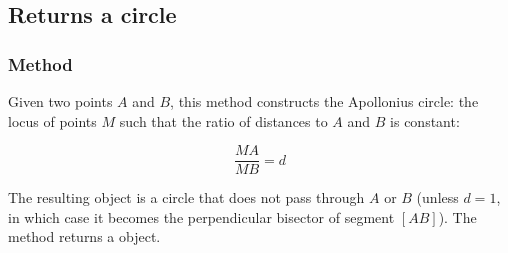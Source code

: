 \begin{minipage}{.5\textwidth}
\begin{center}
\end{center}
\end{minipage}
\begin{minipage}{.5\textwidth}
\begin{tkzexample}
\end{tkzexample}
\end{minipage}

\subsection{Returns a circle}



\subsubsection{Method }
\label{ssub:apollonius_circle_ma_mb_k}

Given two points $A$ and $B$, this method constructs the Apollonius circle: the locus of points $M$ such that the ratio of distances to $A$ and $B$ is constant:

\[
\dfrac{MA}{MB} = d
\]


The resulting object is a circle that does not pass through $A$ or $B$ (unless $d = 1$, in which case it becomes the perpendicular bisector of segment $[AB]$). The method returns a  object.

\vspace{1em}

